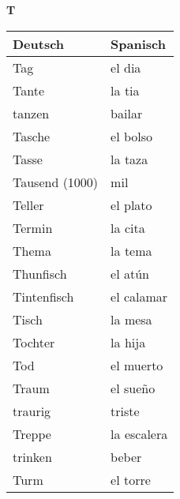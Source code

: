 \begin{flushright}\begin{Huge}\textbf{T}\end{Huge}\end{flushright}

\begin{longtable}{p{} p{}} 
\textbf{Deutsch}     & \textbf{Spanisch}                                       \\ \hline
\hline
\endhead %
Tag & el dia \\
Tante & la tia\\
tanzen & bailar\\
Tasche & el bolso\\
Tasse & la taza\\
Tausend (1000) & mil\\
Teller & el plato\\
Termin & la cita\\
Thema & la tema\\
Thunfisch & el atún\\
Tintenfisch & el calamar\\
Tisch & la mesa\\
Tochter & la hija\\
Tod & el muerto\\
Traum & el sueño\\
traurig & triste \\
Treppe & la escalera\\
trinken & beber\\
Turm & el torre\\

\end{longtable}
